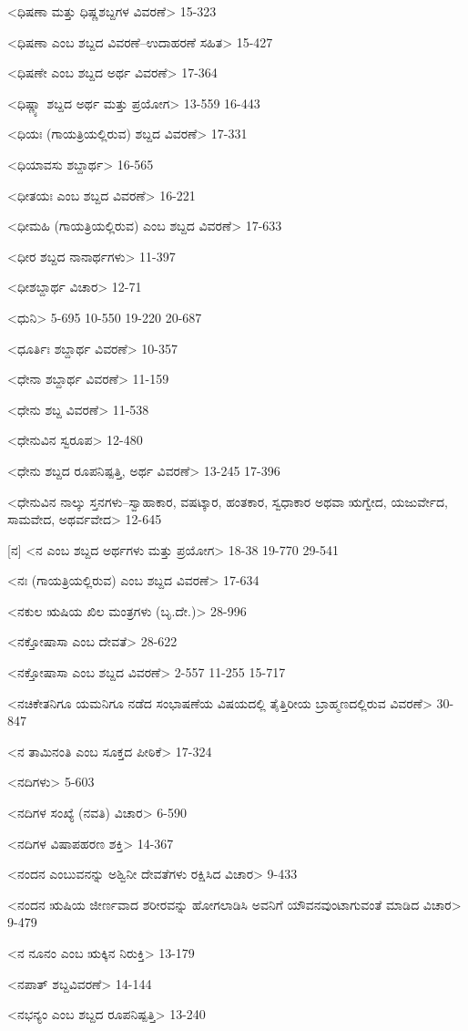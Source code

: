 <ಧಿಷಣಾ ಮತ್ತು ಧಿಷ್ಣಶಬ್ದಗಳ ವಿವರಣೆ>
15-323

<ಧಿಷಣಾ ಎಂಬ ಶಬ್ದದ ವಿವರಣೆ–ಉದಾಹರಣೆ ಸಹಿತ>
15-427

<ಧಿಷಣೇ ಎಂಬ ಶಬ್ದದ ಅರ್ಥ ವಿವರಣೆ>
17-364

<ಧಿಷ್ಣ್ಯಾ ಶಬ್ದದ ಅರ್ಥ ಮತ್ತು ಪ್ರಯೋಗ>
13-559
16-443

<ಧಿಯಃ (ಗಾಯತ್ರಿಯಲ್ಲಿರುವ) ಶಬ್ದದ ವಿವರಣೆ>
17-331

<ಧಿಯಾವಸು ಶಬ್ದಾರ್ಥ>
16-565

<ಧೀತಯಃ ಎಂಬ ಶಬ್ದದ ವಿವರಣೆ>
16-221

<ಧೀಮಹಿ (ಗಾಯತ್ರಿಯಲ್ಲಿರುವ) ಎಂಬ ಶಬ್ದದ ವಿವರಣೆ>
17-633

<ಧೀರ ಶಬ್ದದ ನಾನಾರ್ಥಗಳು>
11-397

<ಧೀಶಬ್ದಾರ್ಥ ವಿಚಾರ>
12-71

<ಧುನಿ>
5-695
10-550 
19-220
20-687

<ಧೂರ್ತಿಃ ಶಬ್ದಾರ್ಥ ವಿವರಣೆ>
10-357

<ಧೇನಾ ಶಬ್ದಾರ್ಥ ವಿವರಣೆ>
11-159

<ಧೇನು ಶಬ್ದ ವಿವರಣೆ>
11-538

<ಧೇನುವಿನ ಸ್ವರೂಪ>
12-480

<ಧೇನು ಶಬ್ದದ ರೂಪನಿಷ್ಪತ್ತಿ, ಅರ್ಥ ವಿವರಣೆ>
13-245
17-396

<ಧೇನುವಿನ ನಾಲ್ಕು ಸ್ತನಗಳು–ಸ್ವಾಹಾಕಾರ, ವಷಟ್ಕಾರ, ಹಂತಕಾರ, ಸ್ವಧಾಕಾರ ಅಥವಾ ಋಗ್ವೇದ, ಯಜುರ್ವೇದ, ಸಾಮವೇದ, ಅಥರ್ವವೇದ>
12-645

[ನ]
<ನ ಎಂಬ ಶಬ್ದದ ಅರ್ಥಗಳು ಮತ್ತು ಪ್ರಯೋಗ>
18-38 
19-770 
29-541

<ನಃ (ಗಾಯತ್ರಿಯಲ್ಲಿರುವ) ಎಂಬ ಶಬ್ದದ ವಿವರಣೆ>
17-634

<ನಕುಲ ಋಷಿಯ ಖಿಲ ಮಂತ್ರಗಳು (ಬೃ.ದೇ.)>
28-996

<ನಕ್ತೋಷಾಸಾ ಎಂಬ ದೇವತೆ>
28-622

<ನಕ್ತೋಷಾಸಾ ಎಂಬ ಶಬ್ದದ ವಿವರಣೆ>
2-557
11-255
15-717

<ನಚಿಕೇತನಿಗೂ ಯಮನಿಗೂ ನಡೆದ ಸಂಭಾಷಣೆಯ ವಿಷಯದಲ್ಲಿ ತೈತ್ತಿರೀಯ ಬ್ರಾಹ್ಮಣದಲ್ಲಿರುವ ವಿವರಣೆ>
30-847

<ನ ತಾಮಿನಂತಿ ಎಂಬ ಸೂಕ್ತದ ಪೀಠಿಕೆ>
17-324

<ನದಿಗಳು>
5-603

<ನದಿಗಳ ಸಂಖ್ಯೆ (ನವತಿ) ವಿಚಾರ>
6-590

<ನದಿಗಳ ವಿಷಾಪಹರಣ ಶಕ್ತಿ>
14-367

<ನಂದನ ಎಂಬುವನನ್ನು ಅಶ್ವಿನೀ ದೇವತೆಗಳು ರಕ್ಷಿಸಿದ ವಿಚಾರ>
9-433

<ನಂದನ ಋಷಿಯ ಜೀರ್ಣವಾದ ಶರೀರವನ್ನು ಹೋಗಲಾಡಿಸಿ ಅವನಿಗೆ ಯೌವನವುಂಟಾಗುವಂತೆ ಮಾಡಿದ ವಿಚಾರ>
9-479

<ನ ನೂನಂ ಎಂಬ ಋಕ್ಕಿನ ನಿರುಕ್ತಿ>
13-179

<ನಪಾತ್‍ ಶಬ್ದವಿವರಣೆ>
14-144

<ನಭನ್ಯಂ ಎಂಬ ಶಬ್ದದ ರೂಪನಿಷ್ಪತ್ತಿ>
13-240

